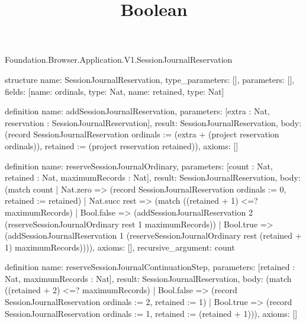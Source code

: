 \begin{lexlean}{Foundation.Browser.Application.V1.SessionJournalReservation}
\title{Boolean}
\begin{semanticmodule}
structure{
  name: SessionJournalReservation,
  type_parameters: [],
  parameters: [],
  fields: [{name: ordinals, type: Nat}, {name: retained, type: Nat}]
}

definition{
  name: addSessionJournalReservation,
  parameters: [extra : Nat, reservation : SessionJournalReservation],
  result: SessionJournalReservation,
  body: (record SessionJournalReservation {ordinals := (extra + (project reservation ordinals)), retained := (project reservation retained)}),
  axioms: []
}

definition{
  name: reserveSessionJournalOrdinary,
  parameters: [count : Nat, retained : Nat, maximumRecords : Nat],
  result: SessionJournalReservation,
  body: (match count
    | Nat.zero => (record SessionJournalReservation {ordinals := 0, retained := retained})
    | Nat.succ rest => (match ((retained + 1) <=? maximumRecords)
      | Bool.false => (addSessionJournalReservation 2 (reserveSessionJournalOrdinary rest 1 maximumRecords))
      | Bool.true => (addSessionJournalReservation 1 (reserveSessionJournalOrdinary rest (retained + 1) maximumRecords)))),
  axioms: [],
  recursive_argument: count
}

definition{
  name: reserveSessionJournalContinuationStep,
  parameters: [retained : Nat, maximumRecords : Nat],
  result: SessionJournalReservation,
  body: (match ((retained + 2) <=? maximumRecords)
    | Bool.false => (record SessionJournalReservation {ordinals := 2, retained := 1})
    | Bool.true => (record SessionJournalReservation {ordinals := 1, retained := (retained + 1)})),
  axioms: []
}


\end{semanticmodule}
\end{lexlean}
